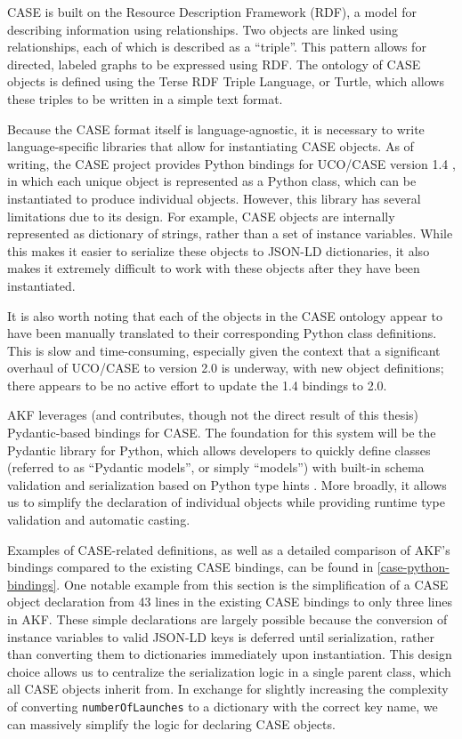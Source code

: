 CASE is built on the Resource Description Framework (RDF), a model for
describing information using relationships. Two objects are linked using
relationships, each of which is described as a ``triple''. This pattern
allows for directed, labeled graphs to be expressed using RDF. The
ontology of CASE objects is defined using the Terse RDF Triple Language,
or Turtle, which allows these triples to be written in a simple text
format.

Because the CASE format itself is language-agnostic, it is necessary to
write language-specific libraries that allow for instantiating CASE
objects. As of writing, the CASE project provides Python bindings for
UCO/CASE version 1.4 \cite{CaseworkCASEMappingPython}, in which each
unique object is represented as a Python class, which can be
instantiated to produce individual objects. However, this library has
several limitations due to its design. For example, CASE objects are
internally represented as dictionary of strings, rather than a set of
instance variables. While this makes it easier to serialize these
objects to JSON-LD dictionaries, it also makes it extremely difficult to
work with these objects after they have been instantiated.

It is also worth noting that each of the objects in the CASE ontology
appear to have been manually translated to their corresponding Python
class definitions. This is slow and time-consuming, especially given the
context that a significant overhaul of UCO/CASE to version 2.0 is
underway, with new object definitions; there appears to be no active
effort to update the 1.4 bindings to 2.0.

AKF leverages (and contributes, though not the direct result of this
thesis) Pydantic-based bindings for CASE. The foundation for this system
will be the Pydantic library for Python, which allows developers to
quickly define classes (referred to as ``Pydantic models'', or simply
``models'') with built-in schema validation and serialization based on
Python type hints \cite{colvinPydantic2024}. More broadly, it allows
us to simplify the declaration of individual objects while providing
runtime type validation and automatic casting.

Examples of CASE-related definitions, as well as a detailed comparison
of AKF's bindings compared to the existing CASE bindings, can be found
in \autoref{case-python-bindings}. One notable
example from this section is the simplification of a CASE object
declaration from 43 lines in the existing CASE bindings to only three
lines in AKF. These simple declarations are largely possible because the
conversion of instance variables to valid JSON-LD keys is deferred until
serialization, rather than converting them to dictionaries immediately
upon instantiation. This design choice allows us to centralize the
serialization logic in a single parent class, which all CASE objects
inherit from. In exchange for slightly increasing the complexity of
converting \passthrough{\lstinline!numberOfLaunches!} to a dictionary
with the correct key name, we can massively simplify the logic for
declaring CASE objects.

